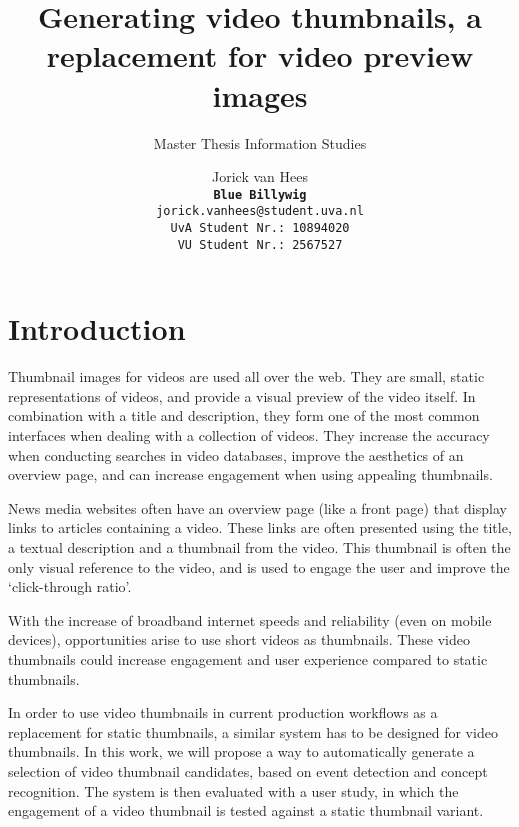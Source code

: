 \documentclass{../resources/acm_proc_article-sp}
\begin{document}
\title{Generating video thumbnails, a replacement for video preview images}
\subtitle{Master Thesis Information Studies}

\author{
Jorick van Hees \\
\texttt{\textbf{Blue Billywig}} \\
\texttt{jorick.vanhees@student.uva.nl} \\
\texttt{UvA Student Nr.: 10894020} \\
\texttt{VU Student Nr.: 2567527}
}

\maketitle


\section{Introduction}

Thumbnail images for videos are used all over the web. They are small, static representations of videos, and provide a visual preview of the video itself. In combination with a title and description, they form one of the most common interfaces when dealing with a collection of videos. They increase the accuracy when conducting searches in video databases, improve the aesthetics of an overview page, and can increase engagement when using appealing thumbnails.

News media websites often have an overview page (like a front page) that display links to articles containing a video. These links are often presented using the title, a textual description and a thumbnail from the video. This thumbnail is often the only visual reference to the video, and is used to engage the user and improve the `click-through ratio'.

With the increase of broadband internet speeds and reliability (even on mobile devices), opportunities arise to use short videos as thumbnails. These video thumbnails could increase engagement and user experience compared to static thumbnails.

In order to use video thumbnails in current production workflows as a replacement for static thumbnails, a similar system has to be designed for video thumbnails. In this work, we will propose a way to automatically generate a selection of video thumbnail candidates, based on event detection and concept recognition. The system is then evaluated with a user study, in which the engagement of a video thumbnail is tested against a static thumbnail variant.
\end{document}
